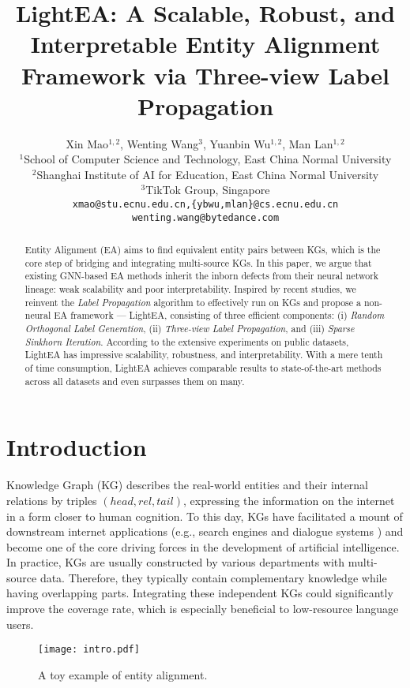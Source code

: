 \documentclass[11pt]{article}
\title{LightEA: A Scalable, Robust, and Interpretable Entity Alignment Framework via Three-view Label Propagation}
\author{Xin Mao$^{1,2}$, Wenting Wang$^3$, Yuanbin Wu$^{1,2}$, Man Lan$^{1,2}$\\
  $^1$School of Computer Science and Technology, East China Normal University \\
  $^2$Shanghai Institute of AI for Education, East China Normal University \\
  $^3$TikTok Group, Singapore\\
  \texttt{xmao@stu.ecnu.edu.cn,\{ybwu,mlan\}@cs.ecnu.edu.cn} \\ \texttt{wenting.wang@bytedance.com}}
\begin{document}
\maketitle
\begin{abstract}
Entity Alignment (EA) aims to find equivalent entity pairs between KGs, which is the core step of bridging and integrating multi-source KGs.
In this paper, we argue that existing GNN-based EA methods inherit the inborn defects from their
neural network lineage: weak scalability and poor interpretability.
Inspired by recent studies, we reinvent the \emph{Label Propagation} algorithm to effectively run on KGs and propose a non-neural EA framework --- LightEA, consisting of three efficient components: (i) \emph{Random Orthogonal Label Generation}, (ii) \emph{Three-view Label Propagation}, and (iii) \emph{Sparse Sinkhorn Iteration}.
According to the extensive experiments on public datasets, LightEA has impressive scalability, robustness, and interpretability.
With a mere tenth of time consumption, LightEA achieves comparable results to state-of-the-art methods across all datasets and even surpasses them on many.
\end{abstract}

\section{Introduction}
\label{sec:intro}

Knowledge Graph (KG) describes the real-world entities and their internal relations by triples $(head, rel, tail)$, expressing the information on the internet in a form closer to human cognition.
To this day, KGs have facilitated a mount of downstream internet applications (e.g., search engines \cite{DBLP:conf/icde/YangAJTW19} and dialogue systems \cite{DBLP:conf/emnlp/YangZE20}) and become one of the core driving forces in the development of artificial intelligence.
In practice, KGs are usually constructed by various departments with multi-source data.
Therefore, they typically contain complementary knowledge while having overlapping parts.
Integrating these independent KGs could significantly improve the coverage rate, which is especially beneficial to low-resource language users.

\begin{figure}
    \centering
    \texttt{[image: intro.pdf]}
    \caption{A toy example of entity alignment.}
    \label{fig:intro}
\end{figure}
\end{document}
